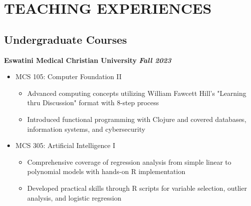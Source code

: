 \documentclass[11pt,letterpaper]{article}
\begin{document}
\section{TEACHING EXPERIENCES}

\subsection*{Undergraduate Courses}

\textbf{Eswatini Medical Christian University} \hfill \textbf{\textit{Fall 2023}}
\begin{itemize}
    \item MCS 105: Computer Foundation II
    \begin{itemize}
        \item Advanced computing concepts utilizing William Fawcett Hill's "Learning thru Discussion" format with 8-step process
        \item Introduced functional programming with Clojure and covered databases, information systems, and cybersecurity
    \end{itemize}
    \item MCS 305: Artificial Intelligence I
    \begin{itemize}
        \item Comprehensive coverage of regression analysis from simple linear to polynomial models with hands-on R implementation
        \item Developed practical skills through R scripts for variable selection, outlier analysis, and logistic regression
    \end{itemize}
\end{itemize}
\end{document}
